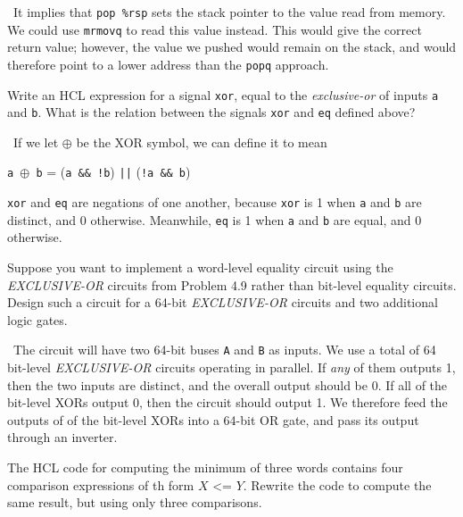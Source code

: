 \documentclass[12pt]{article}
\newenvironment{ex}[2][Exercise]{\begin{trivlist}
		\item[\hskip \labelsep {\bfseries #1}\hskip \labelsep {\bfseries #2.}]}{\end{trivlist}}
\newenvironment{sol}[1][Solution]{\begin{trivlist}
		\item[\hskip \labelsep {\bfseries #1:}]}{\end{trivlist}}
\begin{document}
\begin{sol}
	\
	It implies that \texttt{pop \%rsp} sets the stack pointer to the
	value read from memory. We could use \texttt{mrmovq} to read this
	value instead. This would give the correct return value; however,
	the value we pushed would remain on the stack, and would therefore
	point to a lower address than the \texttt{popq} approach.
\end{sol}

\begin{ex}{4.9}
	Write an HCL expression for a signal \texttt{xor}, equal to the
	\emph{exclusive-or} of inputs \texttt{a} and \texttt{b}. What is
	the relation between the signals \texttt{xor} and \texttt{eq} defined
	above?
\end{ex}

\begin{sol}
	\
	If we let $\oplus$ be the XOR symbol, we can define it to mean
	\begin{center}
	\texttt{a $\oplus$ b} = (\texttt{a \&\& !b}) \texttt{||} (\texttt{!a \&\& b})	
	\end{center}
	\texttt{xor} and \texttt{eq} are negations of one another, because
	\texttt{xor} is 1 when \texttt{a} and \texttt{b} are distinct, and 0
	otherwise. Meanwhile, \texttt{eq} is 1 when \texttt{a} and \texttt{b}
	are equal, and 0 otherwise.
\end{sol}

\begin{ex}{4.10}
	Suppose you want to implement a word-level equality circuit using the
	\emph{EXCLUSIVE-OR} circuits from Problem 4.9 rather than bit-level
	equality circuits. Design such a circuit for a 64-bit \emph{EXCLUSIVE-OR}
	circuits and two additional logic gates.
\end{ex}

\begin{sol}
	\
	The circuit will have two 64-bit buses \texttt{A} and \texttt{B} as inputs.
	We use a total of 64 bit-level \emph{EXCLUSIVE-OR} circuits operating in parallel.
	If \emph{any} of them outputs 1, then the two inputs are distinct, and the
	overall output should be 0. If all of the bit-level XORs output 0, then the
	circuit should output 1. We therefore feed the outputs of of the bit-level XORs
	into a 64-bit OR gate, and pass its output through an inverter.
\end{sol}

\begin{ex}{4.11}
	The HCL code for computing the minimum of three words contains four comparison
	expressions of th form $X$ <= $Y$. Rewrite the code to compute the same result,
	but using only three comparisons.
\end{ex}
\end{document}
